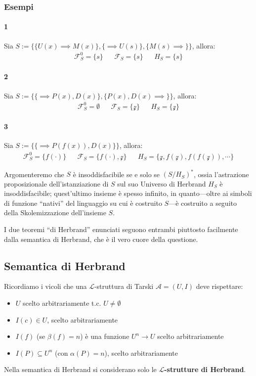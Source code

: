 \subsubsection{Esempi}
\paragraph{1}
Sia $S := \{\{U(x) \implies M(x)\}, \{\implies U(s)\}, \{M(s) \implies\}\}$, allora:
\begin{align*}
\mathscr{F}^0_S = \{s\} &&
\mathscr{F}_S = \{s\} &&
H_S = \{s\}
\end{align*}
\paragraph{2}
Sia $S := \{\{\implies P(x),D(x)\}, \{P(x), D(x) \implies\}\}$, allora: 
\begin{align*}
\mathscr{F}^0_S = \emptyset &&
\mathscr{F}_S = \{\mathcal{z}\} &&
H_S = \{\mathcal{z}\}
\end{align*}
\paragraph{3}
Sia $S := \{\{\implies P(f(x)),D(x)\}\}$, allora: 
\begin{align*}
\mathscr{F}^0_S = \{f(\cdot)\} &&
\mathscr{F}_S = \{f(\cdot),\mathcal{z}\} &&
H_S = \{\mathcal{z}, f(\mathcal{z}), f(f(\mathcal{z})), \cdots\}
\end{align*}

\noindent
Argomenteremo che $S$ è insoddisfacibile se e solo se $(S/H_S)^*$, ossia l'astrazione proposizionale dell'istanziazione di $S$ sul suo Universo di Herbrand $H_S$ è insoddisfacibile; quest'ultimo insieme è spesso infinito, in quanto—oltre ai simboli di funzione ``nativi'' del linguaggio su cui è costruito $S$—è costruito a seguito della Skolemizzazione dell'insieme $S$. 

I due teoremi ``di Herbrand'' enunciati seguono entrambi piuttosto facilmente 
dalla semantica di Herbrand, che è il vero cuore della questione. 

\subsection{Semantica di Herbrand}
Ricordiamo i vicoli che una $\mathscr{L}$-struttura di Tarski $\mathscr{A} = (U,I)$ deve rispettare:
  \begin{itemize}
    \item $U$ scelto arbitrariamente t.c. $U \neq \emptyset$
    \item $I(c) \in U$, scelto arbitrariamente
    \item $I(f)$ (se $\beta(f) = n$) è una funzione $U^n \rightarrow U$ scelto arbitrariamente
    \item $I(P) \subseteq U^n$ (con $\alpha(P) = n$), scelto arbitrariamente
  \end{itemize}
Nella semantica di Herbrand si considerano solo le $\mathscr{L}$\textbf{-strutture di Herbrand}. 

